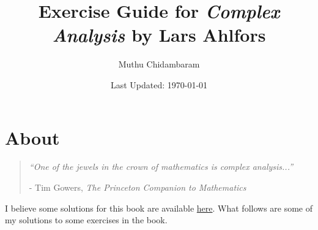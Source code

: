 \documentclass{article}
\begin{document}
\title{Exercise Guide for \textit{Complex Analysis} by Lars Ahlfors}
\author{Muthu Chidambaram}
\date{Last Updated: \today} 

\maketitle

\tableofcontents
\newpage 

\section*{About}

\begin{quote}
        \textit{``One of the jewels in the crown of mathematics is complex analysis...''} 

        - Tim Gowers, \textit{The Princeton Companion to Mathematics}
\end{quote}

I believe some solutions for this book are available \href{https://www.springer.com/cda/content/document/cda_downloaddocument/sol-manual-complex-selected.pdf?SGWID=0-0-45-1635450-p181547661}{here}.
What follows are some of my solutions to some exercises in the book. 



\end{document}
